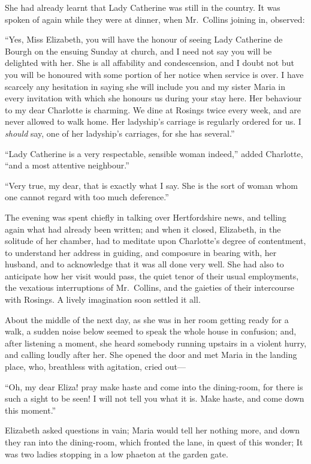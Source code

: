 \documentclass[12pt,english]{book}
\begin{document}
She had already learnt that Lady Catherine was still in the country.
It was spoken of again while they were at dinner, when Mr.\ Collins
joining in, observed:

{}``Yes, Miss Elizabeth, you will have the honour of seeing Lady
Catherine de Bourgh on the ensuing Sunday at church, and I need not
say you will be delighted with her. She is all affability and condescension,
and I doubt not but you will be honoured with some portion of her
notice when service is over. I have scarcely any hesitation in saying
she will include you and my sister Maria in every invitation with
which she honours us during your stay here. Her behaviour to my dear
Charlotte is charming. We dine at Rosings twice every week, and are
never allowed to walk home. Her ladyship's carriage is regularly ordered
for us. I \textit{should} say, one of her ladyship's carriages, for
she has several.''

{}``Lady Catherine is a very respectable, sensible woman indeed,''
added Charlotte, {}``and a most attentive neighbour.''

{}``Very true, my dear, that is exactly what I say. She is the sort
of woman whom one cannot regard with too much deference.''

The evening was spent chiefly in talking over Hertfordshire news,
and telling again what had already been written; and when it closed,
Elizabeth, in the solitude of her chamber, had to meditate upon Charlotte's
degree of contentment, to understand her address in guiding, and composure
in bearing with, her husband, and to acknowledge that it was all done
very well. She had also to anticipate how her visit would pass, the
quiet tenor of their usual employments, the vexatious interruptions
of Mr.\ Collins, and the gaieties of their intercourse with Rosings.
A lively imagination soon settled it all.

About the middle of the next day, as she was in her room getting ready
for a walk, a sudden noise below seemed to speak the whole house in
confusion; and, after listening a moment, she heard somebody running
upstairs in a violent hurry, and calling loudly after her. She opened
the door and met Maria in the landing place, who, breathless with
agitation, cried out\mbox{---}

{}``Oh, my dear Eliza! pray make haste and come into the dining-room,
for there is such a sight to be seen! I will not tell you what it
is. Make haste, and come down this moment.''

Elizabeth asked questions in vain; Maria would tell her nothing more,
and down they ran into the dining-room, which fronted the lane, in
quest of this wonder; It was two ladies stopping in a low phaeton
at the garden gate.
\end{document}
